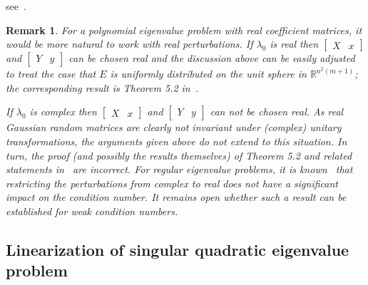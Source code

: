 \documentclass[12pt]{article}
\newcommand{\R}{\mathbb{R}}
\newtheorem{remark}[theorem]{Remark}
\begin{document}
see~\cite[Theorem 5.1]{lotz2020wilkinson}.
\begin{remark}
For a polynomial eigenvalue problem with real coefficient matrices, it would be more natural to work with  real perturbations. If $\lambda_0$ is real then $\begin{bmatrix}
    X & x
\end{bmatrix}$ and $\begin{bmatrix}
    Y & y
\end{bmatrix}$ can be chosen real and the discussion above can be easily adjusted to treat the case that $E$ is uniformly distributed on the unit sphere in $\R^{n^2(m+1)}$; the corresponding result is Theorem 5.2 in~\cite{lotz2020wilkinson}.

If $\lambda_0$ is complex then 
$\begin{bmatrix}
    X & x
\end{bmatrix}$ and $\begin{bmatrix}
    Y & y
\end{bmatrix}$ can \emph{not} be chosen real. As real Gaussian random matrices are clearly not invariant under (complex) unitary transformations, the arguments given above do not extend to this situation.
In turn, the proof (and possibly the results themselves) of Theorem 5.2 and related statements in~\cite{lotz2020wilkinson} are incorrect. For regular eigenvalue problems, it is known~\cite{Byers2004a} that restricting the perturbations from complex to real does not have a significant impact on the condition number. It remains open whether such a result can be established for weak condition numbers.
\end{remark}

\subsection{Linearization of singular quadratic eigenvalue problem} \label{sec:linearization}
\end{document}
